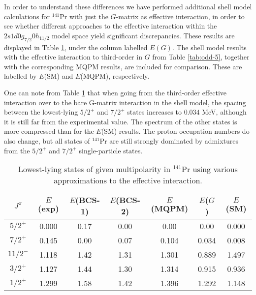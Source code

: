 In order to understand these differences we have performed 
additional shell model calculations for $^{141}$Pr
with just the $G$-matrix as effective interaction,
in order to see whether different approaches
to the effective interaction within the 
$2s1d0g_{7/2}0h_{11/2}$ model space yield 
significant discrepancies. These results are displayed
in Table \ref{tab:shellmqpm}, under the column labelled 
$E(G)$. The shell model results with the effective
interaction to third-order in $G$ from Table \ref{tab:odd-5},
together with the corresponding MQPM results, are
included for comparison. These are labelled by $E$(SM) and
$E$(MQPM), respectively. 

One can note from Table \ref{tab:shellmqpm} that when going from the
third-order effective interaction over to the bare G-matrix interaction
in the shell model, the
spacing between the lowest-lying $5/2^+$ and $7/2^+$  states
increases to $0.034$ MeV, although it is still far from
the experimental value. The spectrum of the other states is more compressed
than for the $E$(SM) results. The proton
occupation numbers do also change, but all states of $^{141}$Pr are still
strongly dominated by  admixtures from the 
$5/2^+$ and $7/2^+$ single-particle states. 

\begin{table}[htbp]
\begin{center}
\caption{Lowest-lying states of given multipolarity in $^{141}$Pr 
using various approximations to the effective interaction.}
\begin{tabular}{ccccccc}
$J^{\pi}$ & $E$(exp) & $E$(BCS-1) & $E$(BCS-2) 
& $E$(MQPM) & $E$($G$) & $E$(SM) \\ 
\hline
$5/2^{+}$ & 0.000 & 0.17 & 0.00  & 0.00  & 0.00  & 0.000 \\
$7/2^{+}$ & 0.145 & 0.00 & 0.07  & 0.104 & 0.034 & 0.008 \\
$11/2^{-}$& 1.118 & 1.42 & 1.31  & 1.301 & 0.889 & 1.497 \\
$3/2^{+}$ & 1.127 & 1.44 & 1.30  & 1.314 & 0.915 & 0.936 \\
$1/2^{+}$ & 1.299 & 1.58 & 1.42  & 1.396 & 1.292 & 1.148 \\
\hline
\end{tabular}
\label{tab:shellmqpm}
\end{center}
\end{table}

